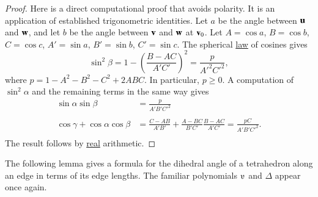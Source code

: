 \begin{proof}  
  Here is a direct computational proof that avoids polarity.  It is an
  application of established trigonometric identities.  Let $a$ be the
  angle between ${\mathbf u}$ and ${\mathbf w}$, and let $b$ be the angle between ${\mathbf v}$
  and ${\mathbf w}$ at ${\mathbf v}_0$.  Let $A=\cos a$, $B=\cos b$, $C=\cos c$,
  $A'=\sin a$, $B'=\sin b$, $C'=\sin c$.  The spherical
  \hyperref[lemma:sloc]{law} of cosines gives
\begin{displaymath}\sin^2\beta = 1-\left(\frac{B-A C}{A' C'}\right)^2
  = \frac{p}{A'^2 C'^2},\end{displaymath}
where $p=1-A^2 - B^2 - C^2 + 2 A B C$.
In particular, $p\ge 0$.
%
A computation of $\sin^2\alpha$ and the remaining terms in the same way gives
\begin{displaymath}
\begin{array}{lll}
  \sin\alpha\sin\beta &= \frac{\displaystyle p}{\displaystyle A' B' C'^2}\\ 
  \\
  \cos\gamma + \cos\alpha \cos\beta &=
  \frac{\displaystyle C - A B}{\displaystyle A' B'} + 
\frac{\displaystyle A - B C}{\displaystyle B' C'} 
\frac{\displaystyle B - A C}{\displaystyle A' C'}
  = \frac{\displaystyle p C}{\displaystyle A' B' C'^2}.\\
\end{array}
\end{displaymath}
The result follows by \hyperref[back:analysis]{real} arithmetic.
\end{proof}

The following lemma gives a formula for the dihedral angle
of a tetrahedron along an edge in terms of its edge lengths.  The
familiar polynomials $\ups$ and $\Delta$ appear once again.
%
%


